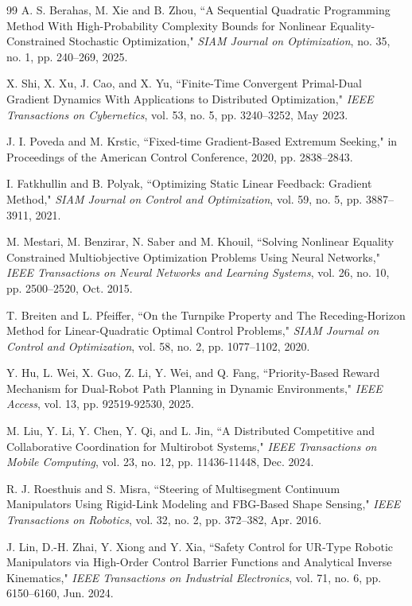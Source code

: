 \documentclass[pdflatex,sn-mathphys,Numbered]{sn-jnl}
\theoremstyle{thmstyleone}
\theoremstyle{thmstyletwo}
\theoremstyle{thmstylethree}
\begin{document}
\begin{thebibliography}{99}
 A. S. Berahas, M. Xie and B. Zhou, ``A Sequential Quadratic Programming Method With High-Probability Complexity Bounds for Nonlinear Equality-Constrained Stochastic Optimization," \emph{SIAM Journal on Optimization}, no. 35, no. 1, pp. 240--269, 2025.

 X. Shi, X. Xu, J. Cao, and X. Yu, ``Finite-Time Convergent Primal-Dual Gradient Dynamics With Applications to Distributed Optimization," \emph{IEEE Transactions on Cybernetics}, vol. 53, no. 5, pp. 3240--3252, May 2023.

 J. I. Poveda and M. Krstic, ``Fixed-time Gradient-Based Extremum Seeking," in Proceedings of the American Control Conference, 2020, pp. 2838--2843.

 I. Fatkhullin and B. Polyak, ``Optimizing Static Linear Feedback: Gradient Method," \emph{SIAM Journal on Control and Optimization}, vol. 59, no. 5, pp. 3887--3911, 2021.

 M. Mestari, M. Benzirar, N. Saber and M. Khouil, ``Solving Nonlinear Equality Constrained Multiobjective Optimization Problems Using Neural Networks," \emph{IEEE Transactions on Neural Networks and Learning Systems}, vol. 26, no. 10, pp. 2500--2520, Oct. 2015.

 T. Breiten and L. Pfeiffer, ``On the Turnpike Property and The Receding-Horizon Method for Linear-Quadratic Optimal Control Problems," \emph{SIAM Journal on Control and Optimization}, vol. 58, no. 2, pp. 1077--1102, 2020.

 Y. Hu, L. Wei, X. Guo, Z. Li, Y. Wei, and Q. Fang, ``Priority-Based Reward Mechanism for Dual-Robot Path Planning in Dynamic Environments," \emph{IEEE Access}, vol. 13, pp. 92519-92530, 2025.

  M. Liu, Y. Li, Y. Chen, Y. Qi, and L. Jin, ``A Distributed Competitive and Collaborative Coordination for Multirobot Systems," \emph{IEEE Transactions on Mobile Computing}, vol. 23, no. 12, pp. 11436-11448, Dec. 2024.

 R. J. Roesthuis and S. Misra, ``Steering of Multisegment Continuum Manipulators Using Rigid-Link Modeling and FBG-Based Shape Sensing," \emph{IEEE Transactions on Robotics}, vol. 32, no. 2, pp. 372--382, Apr. 2016.

 J. Lin, D.-H. Zhai, Y. Xiong and Y. Xia, ``Safety Control for UR-Type Robotic Manipulators via High-Order Control Barrier Functions and Analytical Inverse Kinematics,"  \emph{IEEE Transactions on Industrial Electronics}, vol. 71, no. 6, pp. 6150--6160, Jun. 2024.


\end{thebibliography}
\end{document}
